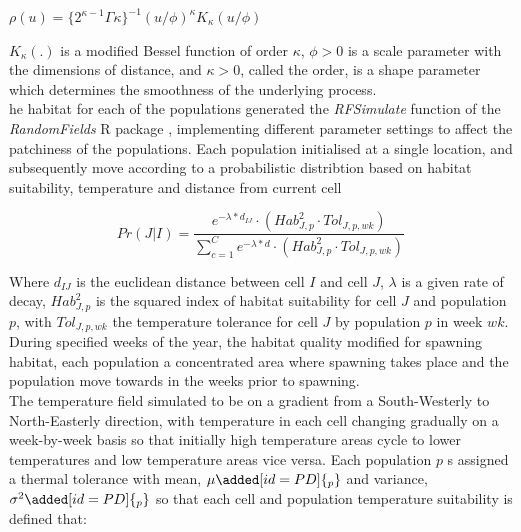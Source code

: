 \documentclass[review]{elsarticle}
\begin{document}
\begin{center}
	$\rho(u) = \{2^{\kappa -
		1}\Gamma{\kappa}\}^{-1}(u/\phi)^{\kappa}K_{\kappa}(u/\phi)$
\end{center}
	
$K_{\kappa}(.)$ is a modified Bessel function of order $\kappa$, $\phi >
0$ is a scale parameter with the dimensions of distance, and $\kappa > 0$,
called the order, is a shape parameter which determines the smoothness of the
underlying process. \\

he habitat for each of the
populations  generated 
the \textit{RFSimulate} function of the \textit{RandomFields} R package
\citep{Schlater2015}, implementing different parameter settings to affect the
patchiness of the populations. Each population 
initialised at a single location, and subsequently move
according to a probabilistic distribtion based on habitat
suitability, temperature and distance from current cell 

\begin{equation}
	Pr(J | I) = \frac{e^{-\lambda * d_{IJ}} \cdot
		(Hab_{J,p}^2 \cdot Tol_{J,p,wk})}{\sum\limits_{c=1}^{C}e^{-\lambda * d} \cdot
		(Hab_{J,p}^2 \cdot Tol_{J,p,wk})}
\end{equation}

Where $d_{IJ}$ is the euclidean distance between cell $I$ and cell $J$,
$\lambda$ is a given rate of decay, $Hab_{J,p}^2$ is the squared index of
habitat suitability for cell $J$ and population $p$, with $Tol_{J,p,wk}$ the
temperature tolerance for cell $J$ by population $p$ in week $wk$.\\

During specified weeks of the year, the habitat quality
 modified for  spawning
habitat,  each
population  a concentrated area where spawning takes
place and the population move towards
 in the weeks prior to
spawning. \\

The temperature field  simulated to be on a gradient
from a South-Westerly to North-Easterly direction, with temperature in each
cell changing gradually on a week-by-week basis so that initially high
temperature areas cycle to lower temperatures and low
temperature areas vice versa. Each population $p$ s
assigned a thermal tolerance with mean, $\mu\added[id=PD]{_{p}}$ and variance,
$\sigma^2\added[id=PD]{_{p}}$ so that each cell and population temperature
suitability is defined that:
\end{document}
